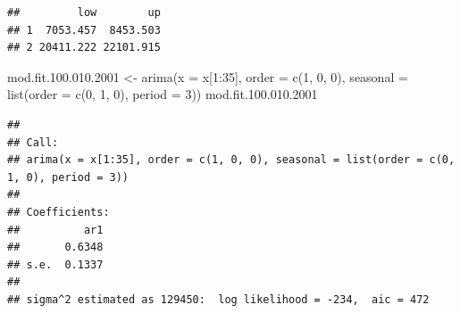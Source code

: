 \documentclass[
]{book}
\newenvironment{Shaded}{\begin{snugshade}}{\end{snugshade}}
\newcommand{\AttributeTok}[1]{\textcolor[rgb]{0.77,0.63,0.00}{#1}}
\newcommand{\ConstantTok}[1]{\textcolor[rgb]{0.00,0.00,0.00}{#1}}
\newcommand{\DecValTok}[1]{\textcolor[rgb]{0.00,0.00,0.81}{#1}}
\newcommand{\FloatTok}[1]{\textcolor[rgb]{0.00,0.00,0.81}{#1}}
\newcommand{\FunctionTok}[1]{\textcolor[rgb]{0.00,0.00,0.00}{#1}}
\newcommand{\NormalTok}[1]{#1}
\newcommand{\OtherTok}[1]{\textcolor[rgb]{0.56,0.35,0.01}{#1}}
\newcommand{\SpecialCharTok}[1]{\textcolor[rgb]{0.00,0.00,0.00}{#1}}
\theoremstyle{definition}
\theoremstyle{definition}
\theoremstyle{definition}
\theoremstyle{definition}
\theoremstyle{remark}
\begin{document}
\begin{Shaded}
\end{Shaded}

\begin{verbatim}
##         low        up
## 1  7053.457  8453.503
## 2 20411.222 22101.915
\end{verbatim}

\begin{Shaded}
\begin{Highlighting}[]
\NormalTok{  mod.fit.}\DecValTok{100}\NormalTok{.}\FloatTok{010.2001} \OtherTok{\textless{}{-}} \FunctionTok{arima}\NormalTok{(}\AttributeTok{x =}\NormalTok{ x[}\DecValTok{1}\SpecialCharTok{:}\DecValTok{35}\NormalTok{], }\AttributeTok{order =} \FunctionTok{c}\NormalTok{(}\DecValTok{1}\NormalTok{, }\DecValTok{0}\NormalTok{, }\DecValTok{0}\NormalTok{), }\AttributeTok{seasonal =} \FunctionTok{list}\NormalTok{(}\AttributeTok{order =} \FunctionTok{c}\NormalTok{(}\DecValTok{0}\NormalTok{, }\DecValTok{1}\NormalTok{, }\DecValTok{0}\NormalTok{), }\AttributeTok{period =} \DecValTok{3}\NormalTok{))}
\NormalTok{  mod.fit.}\DecValTok{100}\NormalTok{.}\FloatTok{010.2001}
\end{Highlighting}
\end{Shaded}

\begin{verbatim}
## 
## Call:
## arima(x = x[1:35], order = c(1, 0, 0), seasonal = list(order = c(0, 1, 0), period = 3))
## 
## Coefficients:
##          ar1
##       0.6348
## s.e.  0.1337
## 
## sigma^2 estimated as 129450:  log likelihood = -234,  aic = 472
\end{verbatim}
\end{document}
